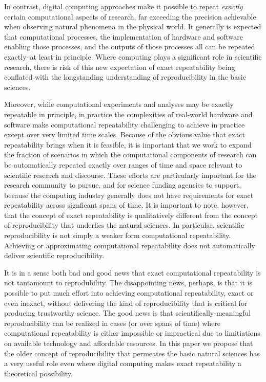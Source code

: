 In contrast, digital computing approaches make it possible to repeat \emph{exactly} certain computational aspects of research,
	 far exceeding the precision achievable when observing natural phenomena in the physical world.  
It generally is expected that computational processes, the implementation of hardware and software 
	enabling those processes, and the outputs of those processes all can be repeated exactly--at least in principle.
Where computing plays a significant role in scientific research, there is risk of this new 
	expectation of exact repeatability being conflated with the longstanding understanding of reproducibility in 
	the basic sciences. 

Moreover, while computational experiments and analyses may be exactly repeatable in principle, 
	in practice the complexities of real-world hardware and software make computational repeatability 
	challenging to achieve in practice except over very limited time scales.
Because of the obvious value that exact repeatability brings when it is feasible, it is important that we work to
	expand the fraction of scenarios in which the computational components of research can be automatically 
	repeated exactly over ranges of time and space relevant to scientific research and discourse.
These efforts are particularly important for the research community to pursue, and for science funding
	agencies to support, because the computing industry generally does not have requirements for exact 
	repeatability across signficant spans of time.
It is important to note, however, that the concept of exact repeatability is 
	qualitatively different from the concept of reproducibility that underlies the natural sciences.
In particular, scientific reproducibility is not simply a weaker form computational repeatability.  
Achieving or approximating computational repeatability does not automatically deliver scientific reproducibility.

It is in a sense both bad and good news that exact computational repeatability is not tantamount to reprodubility.
The disappointing news, perhaps, is that it is possible to put much effort into achieving computational repeatability,
	exact or even inexact,
	without delivering the kind of reproducibility that is critical for producing trustworthy science.
The good news is that scientifically-meaningful reproducibility can be realized in cases (or over spans of time)
	where computational repeatability is either impossible or impractical due to limitiations on
	available technology and affordable resources.
In this paper we propose that the older concept of reproducibility that permeates the basic natural sciences has a very
	useful role even where digital computing makes exact repeatability a theoretical possibility.

